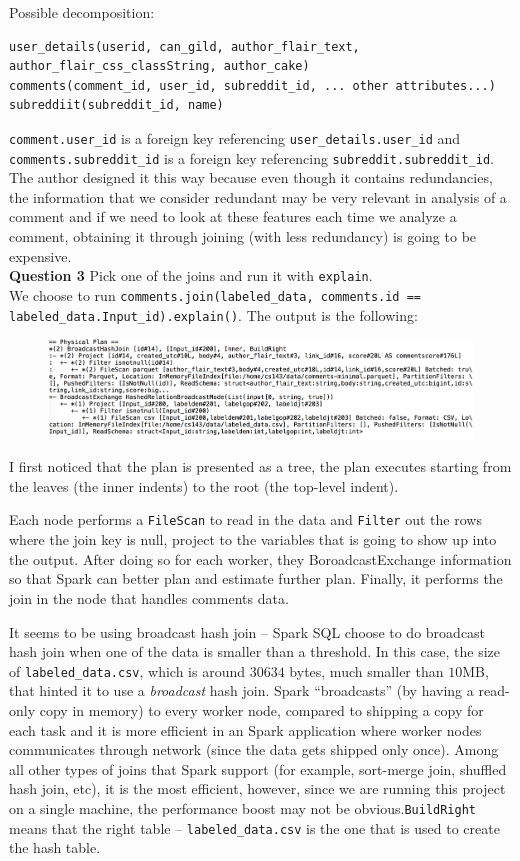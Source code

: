 \documentclass{article}
\begin{document}
\noindent Possible decomposition: 
\begin{verbatim}
user_details(userid, can_gild, author_flair_text, author_flair_css_classString, author_cake)
comments(comment_id, user_id, subreddit_id, ... other attributes...)
subreddiit(subreddit_id, name)	
\end{verbatim}
\texttt{comment.user\_id} is a foreign key referencing \texttt{user\_details.user\_id} and \texttt{comments.subreddit\_id} is a foreign key referencing \texttt{subreddit.subreddit\_id}.\\
\noindent The author designed it this way because even though it contains redundancies, the information that we consider redundant may be very relevant in analysis of a comment and if we need to look at these features each time we analyze a comment, obtaining it through joining (with less redundancy) is going to be expensive.\\[1 em]
\newpage
\noindent \textbf{Question 3} Pick one of the joins and run it with \texttt{explain}.\\
\indent We choose to run \texttt{comments.join(labeled\_data, comments.id == labeled\_data.Input\_id).explain()}. The output is the following:
\begin{figure}[!ht]\centering
\includegraphics[width=\textwidth]{join_explain.png}	
\end{figure}

I first noticed that the plan is presented as a tree, the plan executes starting from the leaves (the inner indents) to the root (the top-level indent).

Each node performs a \texttt{FileScan} to read in the data and \texttt{Filter} out the rows where the join key is null, project to the variables that is going to show up into the output. After doing so for each worker, they BoroadcastExchange information so that Spark can better plan and estimate further plan. Finally, it performs the join in the node that handles comments data.

It seems to be using broadcast hash join -- Spark SQL choose to do broadcast hash join when one of the data is smaller than a threshold. In this case, the size of \texttt{labeled\_data.csv}, which is around $30634$ bytes, much smaller than $10$MB, that hinted it to use a \emph{broadcast} hash join. Spark ``broadcasts'' (by having a read-only copy in memory) to every worker node, compared to shipping a copy for each task and it is more efficient in an Spark application where worker nodes communicates through network (since the data gets shipped only once). Among all other types of joins that Spark support (for example, sort-merge join, shuffled hash join, etc), it is the most efficient, however, since we are running this project on a single machine, the performance boost may not be obvious.\texttt{BuildRight} means that the right table -- \texttt{labeled\_data.csv} is the one that is used to create the hash table.
  
\end{document}
